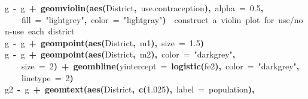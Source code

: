 \documentclass{article}
\makeatletter
\newcommand{\hlnumber}[1]{\textcolor[rgb]{0,0,0}{#1}}%
\newcommand{\hlfunctioncall}[1]{\textcolor[rgb]{.5,0,.33}{\textbf{#1}}}%
\newcommand{\hlstring}[1]{\textcolor[rgb]{.6,.6,1}{#1}}%
\newcommand{\hlkeyword}[1]{\textbf{#1}}%
\newcommand{\hlargument}[1]{\textcolor[rgb]{.69,.25,.02}{#1}}%
\newcommand{\hlcomment}[1]{\textcolor[rgb]{.18,.6,.34}{#1}}%
\newcommand{\hlassignement}[1]{\textbf{#1}}%
\newcommand{\hlsymbol}[1]{#1}%
\newcommand{\hlstd}[1]{\textcolor[rgb]{0,0,0}{#1}}%
\newenvironment{kframe}{%
 \def\FrameCommand##1{\hskip\@totalleftmargin \hskip-\fboxsep
 \colorbox{shadecolor}{##1}\hskip-\fboxsep
     \hskip-\linewidth \hskip-\@totalleftmargin \hskip\columnwidth}%
 \MakeFramed {\advance\hsize-\width
   \@totalleftmargin\z@ \linewidth\hsize
   \@setminipage}}%
 {\par\unskip\endMakeFramed}
\newenvironment{knitrout}{}{} %
\makeatother
\begin{document}
\begin{knitrout}
{\begin{kframe}
\begin{flushleft}
\hlstd{}\hlsymbol{g}{\ }\hlassignement{\usebox{\hlnormalsizeboxlessthan}-}{\ }\hlsymbol{g}{\ }\hlkeyword{+}{\ }\hlfunctioncall{geom\usebox{\hlnormalsizeboxunderscore}violin}\hlkeyword{(}\hlfunctioncall{aes}\hlkeyword{(}\hlsymbol{District}\hlkeyword{,}{\ }\hlsymbol{use.contraception}\hlkeyword{)}\hlkeyword{,}{\ }\hlargument{alpha}{\ }\hlargument{=}{\ }\hlnumber{0.5}\hlkeyword{,}\hspace*{\fill}\\
\hlstd{}{\ }{\ }{\ }{\ }\hlargument{fill}{\ }\hlargument{=}{\ }\hlstring{"lightgrey"}\hlkeyword{,}{\ }\hlargument{color}{\ }\hlargument{=}{\ }\hlstring{"lightgray"}\hlkeyword{)}{\ }{\ }\hlcomment{\usebox{\hlnormalsizeboxhash}\usebox{\hlnormalsizeboxhash}{\ }construct{\ }a{\ }violin{\ }plot{\ }for{\ }use/non-use{\ }each{\ }district}\hspace*{\fill}\\
\hlstd{}\hlsymbol{g}{\ }\hlassignement{\usebox{\hlnormalsizeboxlessthan}-}{\ }\hlsymbol{g}{\ }\hlkeyword{+}{\ }\hlfunctioncall{geom\usebox{\hlnormalsizeboxunderscore}point}\hlkeyword{(}\hlfunctioncall{aes}\hlkeyword{(}\hlsymbol{District}\hlkeyword{,}{\ }\hlsymbol{m1}\hlkeyword{)}\hlkeyword{,}{\ }\hlargument{size}{\ }\hlargument{=}{\ }\hlnumber{1.5}\hlkeyword{)}\hspace*{\fill}\\
\hlstd{}\hlsymbol{g}{\ }\hlassignement{\usebox{\hlnormalsizeboxlessthan}-}{\ }\hlsymbol{g}{\ }\hlkeyword{+}{\ }\hlfunctioncall{geom\usebox{\hlnormalsizeboxunderscore}point}\hlkeyword{(}\hlfunctioncall{aes}\hlkeyword{(}\hlsymbol{District}\hlkeyword{,}{\ }\hlsymbol{m2}\hlkeyword{)}\hlkeyword{,}{\ }\hlargument{color}{\ }\hlargument{=}{\ }\hlstring{"darkgrey"}\hlkeyword{,}\hspace*{\fill}\\
\hlstd{}{\ }{\ }{\ }{\ }\hlargument{size}{\ }\hlargument{=}{\ }\hlnumber{2}\hlkeyword{)}{\ }\hlkeyword{+}{\ }\hlfunctioncall{geom\usebox{\hlnormalsizeboxunderscore}hline}\hlkeyword{(}\hlargument{yintercept}{\ }\hlargument{=}{\ }\hlfunctioncall{logistic}\hlkeyword{(}\hlsymbol{fe2}\hlkeyword{)}\hlkeyword{,}{\ }\hlargument{color}{\ }\hlargument{=}{\ }\hlstring{"darkgrey"}\hlkeyword{,}\hspace*{\fill}\\
\hlstd{}{\ }{\ }{\ }{\ }\hlargument{linetype}{\ }\hlargument{=}{\ }\hlnumber{2}\hlkeyword{)}\hspace*{\fill}\\
\hlstd{}\hlsymbol{g2}{\ }\hlassignement{\usebox{\hlnormalsizeboxlessthan}-}{\ }\hlsymbol{g}{\ }\hlkeyword{+}{\ }\hlfunctioncall{geom\usebox{\hlnormalsizeboxunderscore}text}\hlkeyword{(}\hlfunctioncall{aes}\hlkeyword{(}\hlsymbol{District}\hlkeyword{,}{\ }\hlfunctioncall{c}\hlkeyword{(}\hlnumber{1.025}\hlkeyword{)}\hlkeyword{,}{\ }\hlargument{label}{\ }\hlargument{=}{\ }\hlsymbol{population}\hlkeyword{)}\hlkeyword{,}\hspace*{\fill}\\

\end{flushleft}
\end{kframe}}
\end{knitrout}
\end{document}
